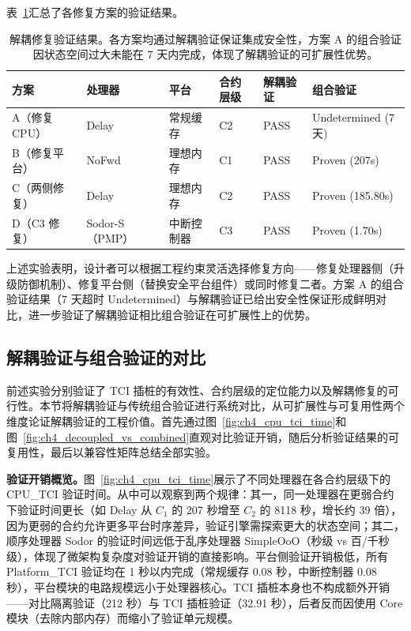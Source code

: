 表~\ref{tab:ch4_fix_results}汇总了各修复方案的验证结果。

\begin{table}[htb]
    \centering
    \caption{解耦修复验证结果。各方案均通过解耦验证保证集成安全性，方案 A 的组合验证因状态空间过大未能在 7 天内完成，体现了解耦验证的可扩展性优势。}
    \label{tab:ch4_fix_results}
    \begin{tabular}{llllll}
        \hline
        \textbf{方案} & \textbf{处理器} & \textbf{平台} & \textbf{合约层级} & \textbf{解耦验证} & \textbf{组合验证} \\
        \hline
        A（修复 CPU） & Delay & 常规缓存 & C2 & PASS & Undetermined (7天) \\
        B（修复平台） & NoFwd & 理想内存 & C1 & PASS & Proven (207s) \\
        C（两侧修复） & Delay & 理想内存 & C2 & PASS & Proven (185.80s) \\
        D（C3 修复） & Sodor-S（PMP） & 中断控制器 & C3 & PASS & Proven (1.70s) \\
        \hline
    \end{tabular}
\end{table}

上述实验表明，设计者可以根据工程约束灵活选择修复方向——修复处理器侧（升级防御机制）、修复平台侧（替换安全平台组件）或同时修复二者。方案 A 的组合验证结果（7 天超时 Undetermined）与解耦验证已给出安全性保证形成鲜明对比，进一步验证了解耦验证相比组合验证在可扩展性上的优势。

\subsection{解耦验证与组合验证的对比}
\label{subsec:ch4_eval_scale}

前述实验分别验证了 TCI 插桩的有效性、合约层级的定位能力以及解耦修复的可行性。本节将解耦验证与传统组合验证进行系统对比，从可扩展性与可复用性两个维度论证解耦验证的工程价值。首先通过图~\ref{fig:ch4_cpu_tci_time}和图~\ref{fig:ch4_decoupled_vs_combined}直观对比验证开销，随后分析验证结果的可复用性，最后以兼容性矩阵总结全部实验。

\textbf{验证开销概览。}图~\ref{fig:ch4_cpu_tci_time}展示了不同处理器在各合约层级下的 CPU\_TCI 验证时间。从中可以观察到两个规律：其一，同一处理器在更弱合约下验证时间更长（如 Delay 从 $C_1$ 的 207 秒增至 $C_2$ 的 8118 秒，增长约 39 倍），因为更弱的合约允许更多平台时序差异，验证引擎需探索更大的状态空间；其二，顺序处理器 Sodor 的验证时间远低于乱序处理器 SimpleOoO（秒级 vs 百/千秒级），体现了微架构复杂度对验证开销的直接影响。平台侧验证开销极低，所有 Platform\_TCI 验证均在 1 秒以内完成（常规缓存 0.08 秒，中断控制器 0.08 秒），平台模块的电路规模远小于处理器核心。TCI 插桩本身也不构成额外开销——对比隔离验证（212 秒）与 TCI 插桩验证（32.91 秒），后者反而因使用 Core 模块（去除内部内存）而缩小了验证单元规模。

